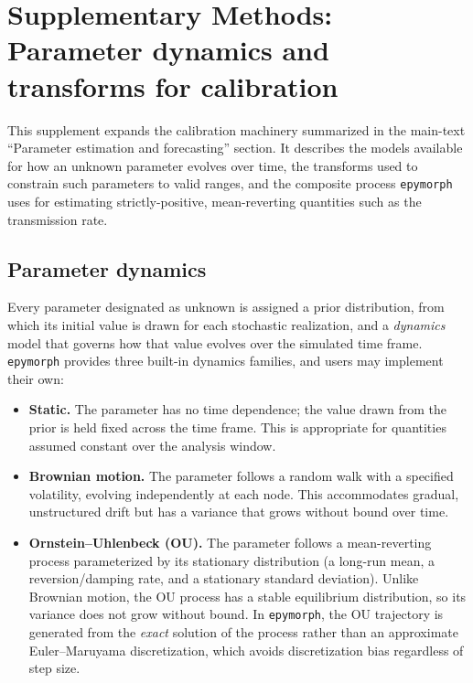 
\section{Supplementary Methods: Parameter dynamics and transforms for calibration}\label{sec:S2}

This supplement expands the calibration machinery summarized in the main-text ``Parameter
estimation and forecasting'' section. It describes the models available for how an unknown
parameter evolves over time, the transforms used to constrain such parameters to valid
ranges, and the composite process \texttt{epymorph} uses for estimating strictly-positive,
mean-reverting quantities such as the transmission rate.

\subsection{Parameter dynamics}

Every parameter designated as unknown is assigned a prior distribution, from which its
initial value is drawn for each stochastic realization, and a \emph{dynamics} model that
governs how that value evolves over the simulated time frame. \texttt{epymorph} provides
three built-in dynamics families, and users may implement their own:

\begin{itemize}
\item
  \textbf{Static.} The parameter has no time dependence; the value drawn from the prior is
  held fixed across the time frame. This is appropriate for quantities assumed constant over
  the analysis window.
\item
  \textbf{Brownian motion.} The parameter follows a random walk with a specified volatility,
  evolving independently at each node. This accommodates gradual, unstructured drift but has
  a variance that grows without bound over time.
\item
  \textbf{Ornstein--Uhlenbeck (OU).} The parameter follows a mean-reverting process
  parameterized by its stationary distribution (a long-run mean, a reversion/damping rate,
  and a stationary standard deviation). Unlike Brownian motion, the OU process has a stable
  equilibrium distribution, so its variance does not grow without bound. In
  \texttt{epymorph}, the OU trajectory is generated from the \emph{exact} solution of the
  process rather than an approximate Euler--Maruyama discretization, which avoids
  discretization bias regardless of step size.
\end{itemize}

